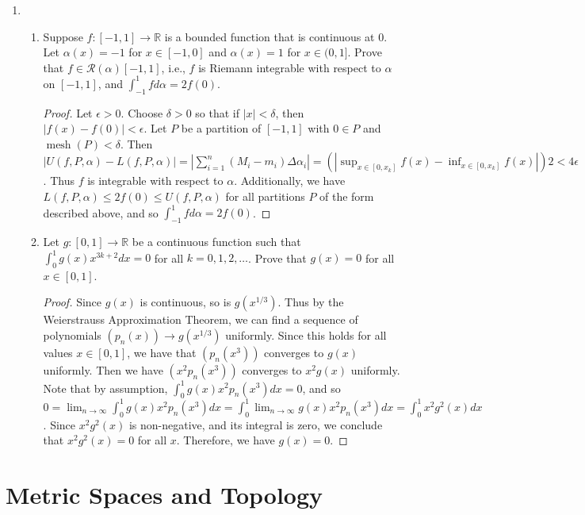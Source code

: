 \documentclass[reqno]{article}
\theoremstyle{remark}
\numberwithin{equation}{section}
\newcommand{\R}{\mathbb{R}}
\begin{document}
\begin{enumerate}
\item \begin{enumerate} 

\item Suppose $f \colon [-1,1] \to \R$ is a bounded function that is continuous at $0$. Let $\alpha(x) = -1$ for $x \in [-1,0]$ and $\alpha(x)=1$ for $x \in (0,1]$. Prove that $f \in \mathcal{R}(\alpha)[-1,1]$, i.e., $f$ is Riemann integrable with respect to $\alpha$ on $[-1,1]$, and $\int_{-1}^1 f d\alpha = 2f(0)$. 

\begin{proof} 
    Let $\epsilon>0$. Choose $\delta >0$ so that if $|x|<\delta$, then $|f(x)-f(0)|<\epsilon$. Let $P$ be a partition of $[-1,1]$ with $0 \in P$ and $\operatorname{mesh}(P)<\delta$. Then $|U(f,P,\alpha)-L(f,P,\alpha)|=|\sum_{i=1}^n(M_i-m_i)\Delta \alpha_i|=(|\sup_{x \in [0,x_k]}f(x)-\inf_{x \in [0,x_k]}f(x)|)2<4\epsilon$. Thus $f$ is integrable with respect to $\alpha$. Additionally, we have $L(f,P,\alpha)\leq 2f(0)\leq U(f,P,\alpha)$ for all partitions $P$ of the form described above, and so $\int_{-1}^1 f d\alpha = 2f(0)$.
\end{proof} 

\item Let $g \colon [0,1] \to \R$ be a continuous function such that $\int_0^1 g(x)x^{3k+2} dx = 0$ for all $k = 0, 1, 2, \ldots$. Prove that $g(x) =0$ for all $x \in [0,1]$. 

\begin{proof} 
    Since $g(x)$ is continuous, so is $g(x^{1/3})$. Thus by the Weierstrauss Approximation Theorem, we can find a sequence of polynomials $(p_n(x))\to g(x^{1/3})$ uniformly. Since this holds for all values $x\in [0,1]$, we have that $(p_n(x^3))$ converges to $g(x)$ uniformly. Then we have $(x^2p_n(x^3))$ converges to $x^2g(x)$ uniformly. Note that by assumption, $\int_0^1 g(x)x^2p_n(x^3)dx=0$, and so $0 = \lim_{n \to \infty}\int_0^1 g(x)x^2p_n(x^3)dx=\int_0^1 \lim_{n \to \infty}g(x)x^2p_n(x^3)dx=\int_0^1x^2g^2(x)dx$. Since $x^2g^2(x)$ is non-negative, and its integral is zero, we conclude that $x^2g^2(x)=0$ for all $x$. Therefore, we have $g(x)=0$.
\end{proof} 

\end{enumerate} 

\end{enumerate} 

\section{Metric Spaces and Topology}
\end{document}
